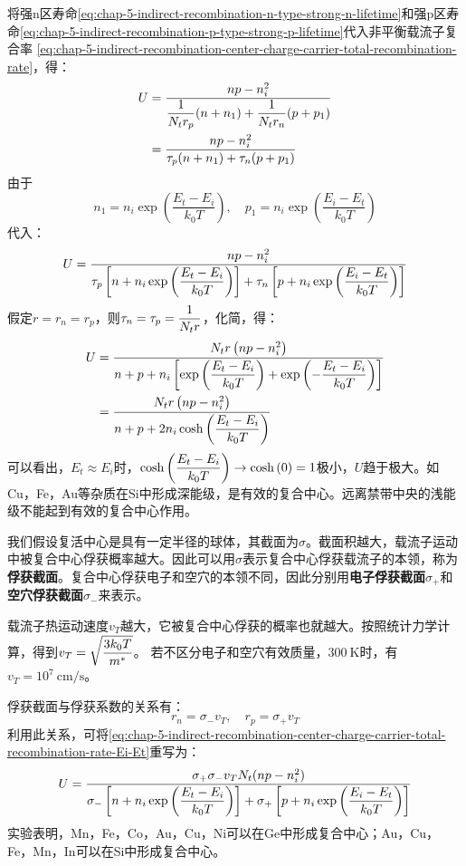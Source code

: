 将强n区寿命\autoref{eq:chap-5-indirect-recombination-n-type-strong-n-lifetime}和强p区寿命\autoref{eq:chap-5-indirect-recombination-p-type-strong-p-lifetime}代入非平衡载流子复合率
\autoref{eq:chap-5-indirect-recombination-center-charge-carrier-total-recombination-rate}，得：
\begin{align}
    U&=\frac{np-n_i^2}{\displaystyle \frac{1}{N_tr_p}(n+n_1)+\frac{1}{N_tr_n}(p+p_1)}\notag\\
    &=\frac{np-n_i^2}{\tau_p(n+n_1)+\tau_n(p+p_1)}
\end{align}
由于
\begin{equation}
    n_1=n_i\exp{\left(\frac{E_t-E_i}{k_0T}\right)},\quad p_1=n_i\exp{\left(\frac{E_i-E_t}{k_0T}\right)}
\end{equation}
代入：
\begin{equation}
    U=\frac{np-n_i^2}{\displaystyle \tau_p\left[n+n_i\exp{\left(\frac{E_t-E_i}{k_0T}\right)}\right]+\tau_n\left[p+n_i\exp{\left(\frac{E_i-E_t}{k_0T}\right)}\right]}\label{eq:chap-5-indirect-recombination-center-charge-carrier-total-recombination-rate-Ei-Et}
\end{equation}
\vspace{1ex}假定$r=r_n=r_p$，则$\displaystyle \tau_n=\tau_p=\frac{1}{N_tr}$，化简，得：
\begin{align}
    U&=\frac{N_tr\left(np-n_i^2\right)}{\displaystyle n+p+n_i\left[\exp{\left(\frac{E_t-E_i}{k_0T}\right)}+\exp{\left(-\frac{E_t-E_i}{k_0T}\right)}\right]}\notag\\
    &=\frac{N_tr\left(np-n_i^2\right)}{\displaystyle n+p+2n_i\cosh{\left(\frac{E_t-E_i}{k_0T}\right)}}
\end{align}
\vspace{1ex}可以看出，$E_t\approx E_i$时，$\displaystyle\cosh{\left(\frac{E_t-E_i}{k_0T}\right)}\rightarrow \cosh{(0)}=1$极小，$U$趋于极大。如Cu，Fe，Au等杂质在Si中形成深能级，是有效的复合中心。远离禁带中央的浅能级不能起到有效的复合中心作用。

我们假设复活中心是具有一定半径的球体，其截面为$\sigma$。截面积越大，载流子运动中被复合中心俘获概率越大。因此可以用$\sigma$表示复合中心俘获载流子的本领，称为\textbf{俘获截面}。复合中心俘获电子和空穴的本领不同，因此分别用\textbf{电子俘获截面}$\sigma_+$和\textbf{空穴俘获截面}$\sigma_-$来表示。

载流子热运动速度$v_T$越大，它被复合中心俘获的概率也就越大。按照统计力学计算，得到$\displaystyle v_T=\sqrt{\frac{3k_0T}{m^*}}$。
若不区分电子和空穴有效质量，$300\ \mathrm{K}$时，有$v_T=10^7\ \mathrm{cm/s}$。\vspace{1ex}

俘获截面与俘获系数的关系有：
\begin{equation}
    r_n=\sigma_-v_T,\quad r_p=\sigma_+v_T
\end{equation}
利用此关系，可将\autoref{eq:chap-5-indirect-recombination-center-charge-carrier-total-recombination-rate-Ei-Et}重写为：
\begin{equation}
    U=\frac{\sigma_+\sigma_-v_TN_t(np-n_i^2)}{\displaystyle \sigma_-\left[n+n_i\exp{\left(\frac{E_t-E_i}{k_0T}\right)}\right]+\sigma_+\left[p+n_i\exp{\left(\frac{E_i-E_t}{k_0T}\right)}\right]}
\end{equation}
实验表明，Mn，Fe，Co，Au，Cu，Ni可以在Ge中形成复合中心；Au，Cu，Fe，Mn，In可以在Si中形成复合中心。

